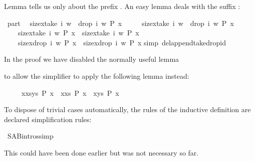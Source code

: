 \begin{isabellebody}
\begin{isamarkuptext}
Lemma  tells us only about the prefix .
An easy lemma deals with the suffix :%
\end{isamarkuptext}%
\ part{}{\isacharcolon}\isanewline
\ \ {\isachardoublequote}{\isasymlbrakk}size{\isacharbrackleft}x{\isasymin}take\ i\ w\ {\isacharat}\ drop\ i\ w{\isachardot}\ P\ x{\isacharbrackright}\ {\isacharequal}\isanewline
\ \ \ \ size{\isacharbrackleft}x{\isasymin}take\ i\ w\ {\isacharat}\ drop\ i\ w{\isachardot}\ {\isasymnot}P\ x{\isacharbrackright}{\isacharplus}{}{\isacharsemicolon}\isanewline
\ \ \ \ size{\isacharbrackleft}x{\isasymin}take\ i\ w{\isachardot}\ P\ x{\isacharbrackright}\ {\isacharequal}\ size{\isacharbrackleft}x{\isasymin}take\ i\ w{\isachardot}\ {\isasymnot}P\ x{\isacharbrackright}{\isacharplus}{}{\isasymrbrakk}\isanewline
\ \ \ {\isasymLongrightarrow}\ size{\isacharbrackleft}x{\isasymin}drop\ i\ w{\isachardot}\ P\ x{\isacharbrackright}\ {\isacharequal}\ size{\isacharbrackleft}x{\isasymin}drop\ i\ w{\isachardot}\ {\isasymnot}P\ x{\isacharbrackright}{\isacharplus}{}{\isachardoublequote}\isanewline
{}simp\ del{\isacharcolon}append{\isacharunderscore}take{\isacharunderscore}drop{\isacharunderscore}id{\isacharparenright}%
\begin{isamarkuptext}%
\noindent
In the proof we have disabled the normally useful lemma
\begin{isabelle}
\end{isabelle}
to allow the simplifier to apply the following lemma instead:
\begin{isabelle}%
\ \ \ \ \ {\isacharbrackleft}x{\isasymin}xs{\isacharat}ys{\isachardot}\ P\ x{\isacharbrackright}\ {\isacharequal}\ {\isacharbrackleft}x{\isasymin}xs{\isachardot}\ P\ x{\isacharbrackright}\ {\isacharat}\ {\isacharbrackleft}x{\isasymin}ys{\isachardot}\ P\ x{\isacharbrackright}%
\end{isabelle}

To dispose of trivial cases automatically, the rules of the inductive
definition are declared simplification rules:%
\end{isamarkuptext}%
\ S{\isacharunderscore}A{\isacharunderscore}B{\isachardot}intros{\isacharbrackleft}simp{\isacharbrackright}%
\begin{isamarkuptext}%
\noindent
This could have been done earlier but was not necessary so far.


\end{isamarkuptext}
\end{isabellebody}
